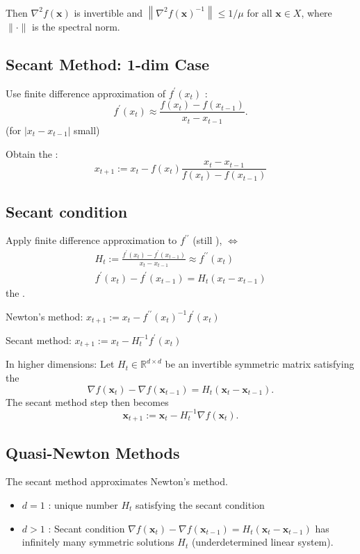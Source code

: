 Then $\nabla^{2} f(\mathbf{x})$ is invertible and $\left\|\nabla^{2} f(\mathbf{x})^{-1}\right\| \leq 1 / \mu$ for all $\mathbf{x} \in X$, where $\|\cdot\|$ is the spectral norm.




\subsection*{Secant Method: 1-dim Case}
Use finite difference approximation of $f^{\prime}\left(x_{t}\right)$ :
$$
f^{\prime}\left(x_{t}\right) \approx \frac{f\left(x_{t}\right)-f\left(x_{t-1}\right)}{x_{t}-x_{t-1}} .
$$
(for $\left|x_{t}-x_{t-1}\right|$ small)

Obtain the :
$$
x_{t+1}:=x_{t}-f\left(x_{t}\right) \frac{x_{t}-x_{t-1}}{f\left(x_{t}\right)-f\left(x_{t-1}\right)}
$$






\subsection*{Secant condition}
Apply finite difference approximation to $f^{\prime \prime}$ (still ), $\Leftrightarrow$
$$
\begin{gathered}
H_{t}:=\frac{f^{\prime}\left(x_{t}\right)-f^{\prime}\left(x_{t-1}\right)}{x_{t}-x_{t-1}} \approx f^{\prime \prime}\left(x_{t}\right) \\
f^{\prime}\left(x_{t}\right)-f^{\prime}\left(x_{t-1}\right)=H_{t}\left(x_{t}-x_{t-1}\right)
\end{gathered}
$$
the .

Newton's method: $x_{t+1}:=x_{t}-f^{\prime \prime}\left(x_{t}\right)^{-1} f^{\prime}\left(x_{t}\right)$

Secant method: $x_{t+1}:=x_{t}-H_{t}^{-1} f^{\prime}\left(x_{t}\right)$

In higher dimensions: Let $H_{t} \in \mathbb{R}^{d \times d}$ be an invertible symmetric matrix satisfying the 
$$
\nabla f\left(\mathbf{x}_{t}\right)-\nabla f\left(\mathbf{x}_{t-1}\right)=H_{t}\left(\mathbf{x}_{t}-\mathbf{x}_{t-1}\right) .
$$
The secant method step then becomes
$$
\mathbf{x}_{t+1}:=\mathbf{x}_{t}-H_{t}^{-1} \nabla f\left(\mathbf{x}_{t}\right) .
$$







\subsection*{Quasi-Newton Methods}
The secant method approximates Newton's method.
\begin{itemize}[leftmargin=*]
    \item $d=1$ : unique number $H_{t}$ satisfying the secant condition
    \item $d>1$ : Secant condition $\nabla f\left(\mathbf{x}_{t}\right)-\nabla f\left(\mathbf{x}_{t-1}\right)=H_{t}\left(\mathbf{x}_{t}-\mathbf{x}_{t-1}\right)$ has infinitely many symmetric solutions $H_{t}$ (underdetermined linear system).
\end{itemize}



